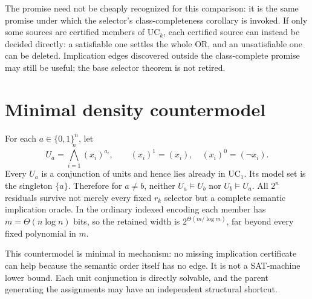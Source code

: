 \documentclass[11pt]{article}
\begin{document}
The promise need not be cheaply recognized for this comparison: it is the
same promise under which the selector's class-completeness corollary is
invoked.  If only some sources are certified members of $\mathrm{UC}_k$,
each certified source can instead be decided directly: a satisfiable one
settles the whole OR, and an unsatisfiable one can be deleted.  Implication
edges discovered outside the class-complete promise may still be useful;
the base selector theorem is not retired.

\section{Minimal density countermodel}
For each $a\in\{0,1\}^n$, let
\[
 U_a=\bigwedge_{i=1}^n (x_i)^{a_i},
 \qquad (x_i)^1=(x_i),\quad (x_i)^0=(\neg x_i).
\]
Every $U_a$ is a conjunction of units and hence lies already in
$\mathrm{UC}_1$.  Its model set is the singleton $\{a\}$.  Therefore for
$a\ne b$, neither $U_a\models U_b$ nor $U_b\models U_a$.  All $2^n$
residuals survive not merely every fixed $r_k$ selector but a complete
semantic implication oracle.  In the ordinary indexed encoding each member
has $m=\Theta(n\log n)$ bits, so the retained width is
$2^{\Theta(m/\log m)}$, far beyond every fixed polynomial in $m$.

This countermodel is minimal in mechanism: no missing implication
certificate can help because the semantic order itself has no edge.  It is
not a SAT-machine lower bound.  Each unit conjunction is directly solvable,
and the parent generating the assignments may have an independent
structural shortcut.
\end{document}

